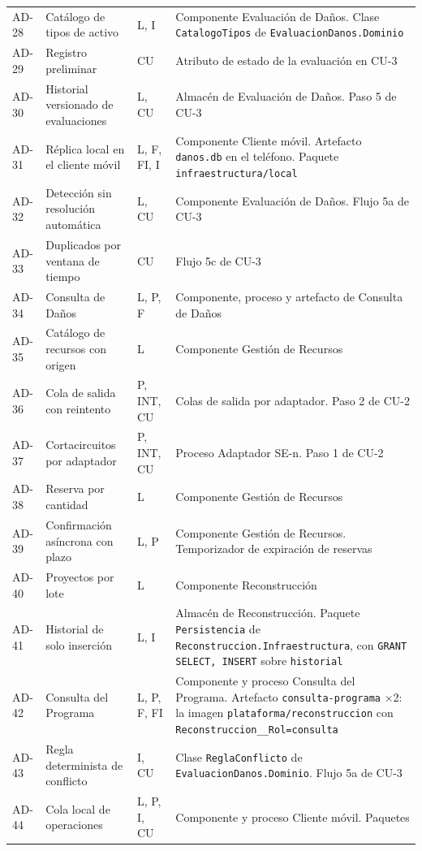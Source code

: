 \documentclass[11pt,letterpaper]{article}
\providecommand{\br}{\discretionary{}{}{}}
\begin{document}
\begin{longtable}{L{1.3cm} L{5.2cm} L{1.6cm} L{7.4cm}}
AD-28 & Catálogo de tipos de activo & L, I & Componente Evaluación de Daños. Clase
\texttt{CatalogoTipos} de \texttt{EvaluacionDanos.\br{}Dominio} \\
AD-29 & Registro preliminar & CU & Atributo de estado de la evaluación en CU-3 \\
AD-30 & Historial versionado de evaluaciones & L, CU & Almacén de Evaluación de Daños. Paso 5 de
CU-3 \\
AD-31 & Réplica local en el cliente móvil & L, F, FI, I & Componente Cliente móvil. Artefacto
\texttt{danos.db} en el teléfono. Paquete \texttt{infraestructura/\br{}local} \\
AD-32 & Detección sin resolución automática & L, CU & Componente Evaluación de Daños. Flujo 5a de
CU-3 \\
AD-33 & Duplicados por ventana de tiempo & CU & Flujo 5c de CU-3 \\
AD-34 & Consulta de Daños & L, P, F & Componente, proceso y artefacto de Consulta de Daños \\
AD-35 & Catálogo de recursos con origen & L & Componente Gestión de Recursos \\
AD-36 & Cola de salida con reintento & P, INT, CU & Colas de salida por adaptador. Paso 2 de CU-2 \\
AD-37 & Cortacircuitos por adaptador & P, INT, CU & Proceso Adaptador SE-n. Paso 1 de CU-2 \\
AD-38 & Reserva por cantidad & L & Componente Gestión de Recursos \\
AD-39 & Confirmación asíncrona con plazo & L, P & Componente Gestión de Recursos. Temporizador de
expiración de reservas \\
AD-40 & Proyectos por lote & L & Componente Reconstrucción \\
AD-41 & Historial de solo inserción & L, I & Almacén de Reconstrucción. Paquete
\texttt{Persistencia} de \texttt{Reconstruccion.\br{}Infraestructura}, con \texttt{GRANT SELECT, INSERT}
sobre \texttt{historial} \\
AD-42 & Consulta del Programa & L, P, F, FI & Componente y proceso Consulta del Programa. Artefacto
\texttt{consulta-\br{}programa} ×2: la imagen \texttt{plataforma/\br{}reconstruccion} con
\texttt{Reconstruccion\_\br{}\_\br{}Rol=consulta} \\
AD-43 & Regla determinista de conflicto & I, CU & Clase \texttt{ReglaConflicto} de
\texttt{EvaluacionDanos.\br{}Dominio}. Flujo 5a de CU-3 \\
AD-44 & Cola local de operaciones & L, P, I, CU & Componente y proceso Cliente móvil. Paquetes

\end{longtable}
\end{document}
